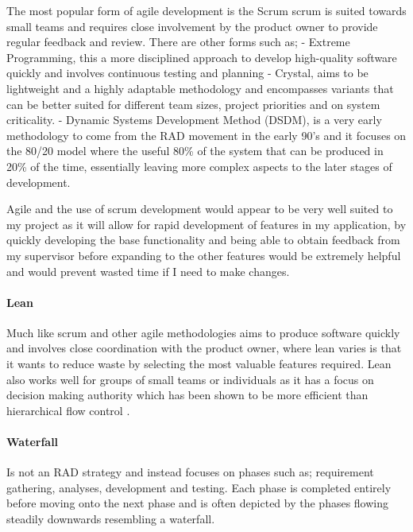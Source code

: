 The most popular form of agile development is the Scrum \cite{agile}
scrum is suited towards small teams and requires close involvement by
the product owner to provide regular feedback and review. There are
other forms such as; - Extreme Programming, this a more disciplined
approach to develop high-quality software quickly and involves
continuous testing and planning - Crystal, aims to be lightweight and a
highly adaptable methodology and encompasses variants that can be better
suited for different team sizes, project priorities and on system
criticality. \cite{agilemethods} - Dynamic Systems Development Method
(DSDM), is a very early methodology to come from the RAD movement in the
early 90's and it focuses on the 80/20 model where the useful 80\% of
the system that can be produced in 20\% of the time, essentially leaving
more complex aspects to the later stages of development.
\cite{agilemethods}

Agile and the use of scrum development would appear to be very well
suited to my project as it will allow for rapid development of features
in my application, by quickly developing the base functionality and
being able to obtain feedback from my supervisor before expanding to the
other features would be extremely helpful and would prevent wasted time
if I need to make changes.

\paragraph{Lean}\label{lean}

Much like scrum and other agile methodologies aims to produce software
quickly and involves close coordination with the product owner, where
lean varies is that it wants to reduce waste by selecting the most
valuable features required. Lean also works well for groups of small
teams or individuals as it has a focus on decision making authority
which has been shown to be more efficient than hierarchical flow control
\cite{agilemethods}.

\paragraph{Waterfall}\label{waterfall}

Is not an RAD strategy and instead focuses on phases such as;
requirement gathering, analyses, development and testing. Each phase is
completed entirely before moving onto the next phase and is often
depicted by the phases flowing steadily downwards resembling a
waterfall.

